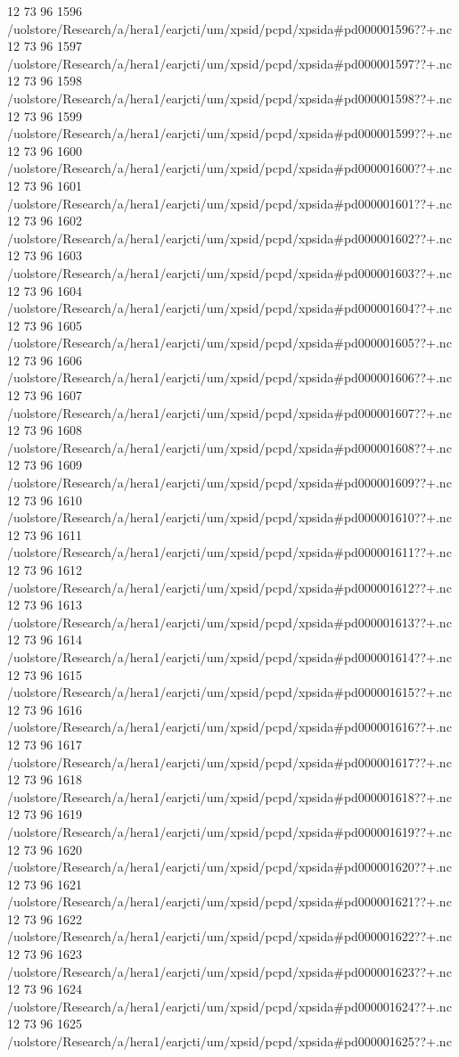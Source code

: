 12 73 96
1596
/uolstore/Research/a/hera1/earjcti/um/xpsid/pcpd/xpsida#pd000001596??+.nc
12 73 96
1597
/uolstore/Research/a/hera1/earjcti/um/xpsid/pcpd/xpsida#pd000001597??+.nc
12 73 96
1598
/uolstore/Research/a/hera1/earjcti/um/xpsid/pcpd/xpsida#pd000001598??+.nc
12 73 96
1599
/uolstore/Research/a/hera1/earjcti/um/xpsid/pcpd/xpsida#pd000001599??+.nc
12 73 96
1600
/uolstore/Research/a/hera1/earjcti/um/xpsid/pcpd/xpsida#pd000001600??+.nc
12 73 96
1601
/uolstore/Research/a/hera1/earjcti/um/xpsid/pcpd/xpsida#pd000001601??+.nc
12 73 96
1602
/uolstore/Research/a/hera1/earjcti/um/xpsid/pcpd/xpsida#pd000001602??+.nc
12 73 96
1603
/uolstore/Research/a/hera1/earjcti/um/xpsid/pcpd/xpsida#pd000001603??+.nc
12 73 96
1604
/uolstore/Research/a/hera1/earjcti/um/xpsid/pcpd/xpsida#pd000001604??+.nc
12 73 96
1605
/uolstore/Research/a/hera1/earjcti/um/xpsid/pcpd/xpsida#pd000001605??+.nc
12 73 96
1606
/uolstore/Research/a/hera1/earjcti/um/xpsid/pcpd/xpsida#pd000001606??+.nc
12 73 96
1607
/uolstore/Research/a/hera1/earjcti/um/xpsid/pcpd/xpsida#pd000001607??+.nc
12 73 96
1608
/uolstore/Research/a/hera1/earjcti/um/xpsid/pcpd/xpsida#pd000001608??+.nc
12 73 96
1609
/uolstore/Research/a/hera1/earjcti/um/xpsid/pcpd/xpsida#pd000001609??+.nc
12 73 96
1610
/uolstore/Research/a/hera1/earjcti/um/xpsid/pcpd/xpsida#pd000001610??+.nc
12 73 96
1611
/uolstore/Research/a/hera1/earjcti/um/xpsid/pcpd/xpsida#pd000001611??+.nc
12 73 96
1612
/uolstore/Research/a/hera1/earjcti/um/xpsid/pcpd/xpsida#pd000001612??+.nc
12 73 96
1613
/uolstore/Research/a/hera1/earjcti/um/xpsid/pcpd/xpsida#pd000001613??+.nc
12 73 96
1614
/uolstore/Research/a/hera1/earjcti/um/xpsid/pcpd/xpsida#pd000001614??+.nc
12 73 96
1615
/uolstore/Research/a/hera1/earjcti/um/xpsid/pcpd/xpsida#pd000001615??+.nc
12 73 96
1616
/uolstore/Research/a/hera1/earjcti/um/xpsid/pcpd/xpsida#pd000001616??+.nc
12 73 96
1617
/uolstore/Research/a/hera1/earjcti/um/xpsid/pcpd/xpsida#pd000001617??+.nc
12 73 96
1618
/uolstore/Research/a/hera1/earjcti/um/xpsid/pcpd/xpsida#pd000001618??+.nc
12 73 96
1619
/uolstore/Research/a/hera1/earjcti/um/xpsid/pcpd/xpsida#pd000001619??+.nc
12 73 96
1620
/uolstore/Research/a/hera1/earjcti/um/xpsid/pcpd/xpsida#pd000001620??+.nc
12 73 96
1621
/uolstore/Research/a/hera1/earjcti/um/xpsid/pcpd/xpsida#pd000001621??+.nc
12 73 96
1622
/uolstore/Research/a/hera1/earjcti/um/xpsid/pcpd/xpsida#pd000001622??+.nc
12 73 96
1623
/uolstore/Research/a/hera1/earjcti/um/xpsid/pcpd/xpsida#pd000001623??+.nc
12 73 96
1624
/uolstore/Research/a/hera1/earjcti/um/xpsid/pcpd/xpsida#pd000001624??+.nc
12 73 96
1625
/uolstore/Research/a/hera1/earjcti/um/xpsid/pcpd/xpsida#pd000001625??+.nc
